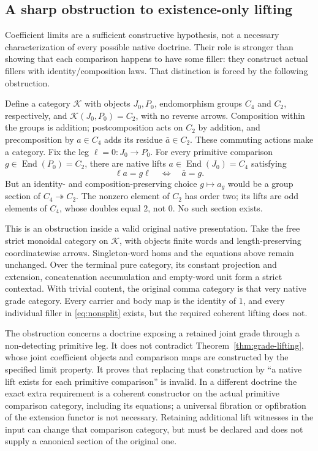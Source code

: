 \documentclass[11pt]{article}
\begin{document}
\subsection{A sharp obstruction to existence-only lifting}

Coefficient limits are a sufficient constructive hypothesis, not a necessary characterization of every possible native doctrine. Their role is stronger than showing that each comparison happens to have some filler: they construct actual fillers with identity/composition laws. That distinction is forced by the following obstruction.

Define a category $\mathcal K$ with objects $J_0,P_0$, endomorphism groups $C_4$ and $C_2$, respectively, and $\mathcal K(J_0,P_0)=C_2$, with no reverse arrows. Composition within the groups is addition; postcomposition acts on $C_2$ by addition, and precomposition by $a\in C_4$ adds its residue $\bar a\in C_2$. These commuting actions make a category. Fix the leg $\ell=0:J_0\to P_0$. For every primitive comparison $g\in\operatorname{End}(P_0)=C_2$, there are native lifts $a\in\operatorname{End}(J_0)=C_4$ satisfying
\[
 \ell a=g\ell\quad\Longleftrightarrow\quad \bar a=g. \tag{NS}\label{eq:nonsplit}
\]
But an identity- and composition-preserving choice $g\mapsto a_g$ would be a group section of $C_4\twoheadrightarrow C_2$. The nonzero element of $C_2$ has order two; its lifts are odd elements of $C_4$, whose doubles equal $2$, not $0$. No such section exists.

This is an obstruction inside a valid original native presentation. Take the free strict monoidal category on $\mathcal K$, with objects finite words and length-preserving coordinatewise arrows. Singleton-word homs and the equations above remain unchanged. Over the terminal pure category, its constant projection and extension, concatenation accumulation and empty-word unit form a strict contextad. With trivial content, the original comma category is that very native grade category. Every carrier and body map is the identity of $1$, and every individual filler in \eqref{eq:nonsplit} exists, but the required coherent lifting does not.

The obstruction concerns a doctrine exposing a retained joint grade through a non-detecting primitive leg. It does not contradict Theorem~\ref{thm:grade-lifting}, whose joint coefficient objects and comparison maps are constructed by the specified limit property. It proves that replacing that construction by ``a native lift exists for each primitive comparison'' is invalid. In a different doctrine the exact extra requirement is a coherent constructor on the actual primitive comparison category, including its equations; a universal fibration or opfibration of the extension functor is not necessary. Retaining additional lift witnesses in the input can change that comparison category, but must be declared and does not supply a canonical section of the original one.
\end{document}
